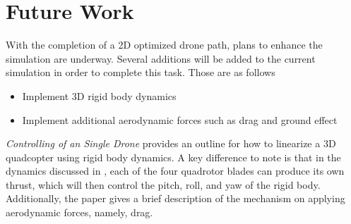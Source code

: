 \documentclass[12pt]{article}
\begin{document}
	
	\clearpage
	\section{Future Work}
	With the completion of a 2D optimized drone path, plans to enhance the simulation are underway. Several additions will be added to the current simulation in order to complete this task. Those are as follows 
	\newline
	\begin{itemize}
		\item Implement 3D rigid body dynamics
		\item Implement additional aerodynamic forces such as drag and ground effect
	\end{itemize}
	\textit{Controlling of an Single Drone}\cite{Controlling of an Single Drone} provides an outline for how to linearize a 3D quadcopter using rigid body dynamics. A key difference to note is that in the dynamics discussed in \cite{Controlling of an Single Drone}, each of the four quadrotor blades can produce its own thrust, which will then control the pitch, roll, and yaw of the rigid body. Additionally, the paper gives a brief description of the mechanism on applying aerodynamic forces, namely, drag.
	
	
	\clearpage
	
	
	
\end{document}
